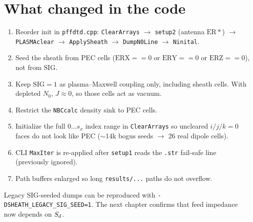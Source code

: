 \section{What changed in the code}

\begin{enumerate}[leftmargin=1.5em]
\item Reorder init in \texttt{pffdtd.cpp}: \texttt{ClearArrays} \(\to\) \texttt{setup2} (antenna \(\mathrm{ER*}\)) \(\to\) \texttt{PLASMAclear} \(\to\) \texttt{ApplySheath} \(\to\) \texttt{DumpN0Line} \(\to\) \texttt{Ninital}.
\item Seed the sheath from PEC cells (\(\mathrm{ERX}==0\) or \(\mathrm{ERY}==0\) or \(\mathrm{ERZ}==0\)), not from \(\mathrm{SIG}\).
\item Keep \(\mathrm{SIG}=1\) as plasma--Maxwell coupling only, including sheath cells. With depleted \(N_0\), \(J\approx 0\), so those cells act as vacuum.
\item Restrict the \texttt{NBCcalc} density sink to PEC cells.
\item Initialize the full \(0\ldots s_x\) index range in \texttt{ClearArrays} so uncleared \(i/j/k=0\) faces do not look like PEC (\(\sim\)14k bogus seeds \(\to\) 26 real dipole cells).
\item CLI \texttt{MaxIter} is re-applied after \texttt{setup1} reads the \texttt{.str} fail-safe line (previously ignored).
\item Path buffers enlarged so long \texttt{results/...} paths do not overflow.
\end{enumerate}

Legacy SIG-seeded dumps can be reproduced with \texttt{-DSHEATH\_LEGACY\_SIG\_SEED=1}. The next chapter confirms that feed impedance now depends on \(S_d\).
